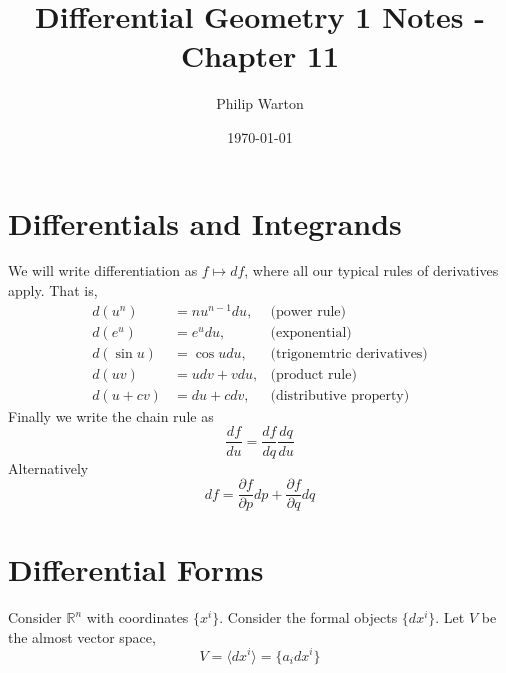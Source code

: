 \documentclass{article}
\theoremstyle{definition}
\begin{document}
\title{Differential Geometry 1 Notes - Chapter 11}
\author{Philip Warton}
\date{\today}
\maketitle
\section{Differentials and Integrands}
We will write differentiation as $f \longmapsto df$, where all our typical rules
of derivatives apply. That is,
\begin{align*}
    d(u^n) & = nu^{n-1}du, & \text{(power rule)}\\
    d(e^u) & = e^u du, & \text{(exponential)}\\
    d(\sin u) & = \cos u du, & \text{(trigonemtric derivatives)}\\
    d(uv) & = udv + vdu, & \text{(product rule)}\\
    d(u + cv) & = du + cdv, & \text{(distributive property)}
\end{align*}
Finally we write the chain rule as
\[
    \frac{df}{du} = \frac{df}{dq}\frac{dq}{du}
\]
Alternatively
\[
    df = \frac{\partial f}{\partial p}dp + \frac{\partial f}{\partial q}dq
\]

\section{Differential Forms}
Consider $\mathbb{R}^n$ with coordinates $\{x^i\}$.
Consider the formal objects $\{dx^i\}$.
Let $V$ be the almost vector space,
\[
    V = \langle dx^i \rangle = \{a_i dx^i\}
\]
\end{document}
